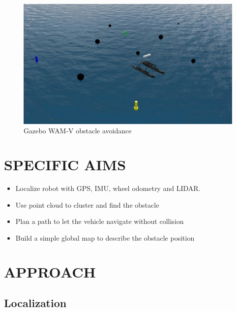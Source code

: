 \documentclass[letterpaper, 10 pt, conference]{ieeeconf}  %
\begin{document}
\begin{figure}[t] %
\includegraphics[width=0.9\columnwidth]{gazebo}
\centering
\caption{Gazebo WAM-V obstacle avoidance}
 \label{figure: WAM-V}
\end{figure}

\section{SPECIFIC AIMS}

\begin{itemize}
\item Localize robot with GPS, IMU, wheel odometry and LIDAR.
\end{itemize}

\begin{itemize}
\item Use point cloud to cluster and find the obstacle
\end{itemize}

\begin{itemize}
\item Plan a path to let the vehicle navigate without collision
\end{itemize}

\begin{itemize}
\item Build a simple global map to describe the obstacle position
\end{itemize}

\section{APPROACH}

\subsection{Localization}
\end{document}
